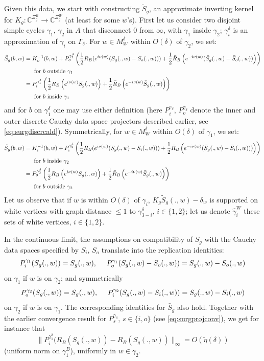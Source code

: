 \documentclass[10pt]{article}
\newcommand{\C}{\mathbb{C}}
\begin{document}
Given this data, we start with constructing $\tilde S_g$, an approximate inverting kernel for $K_g:\C^{\Xi_g^B}\rightarrow\C^{\Xi_g^W}$ (at least for some $w$'s). First let us consider two disjoint simple cycles $\gamma_1$, $\gamma_2$ in $A$ that disconnect $0$ from $\infty$, with $\gamma_1$ inside $\gamma_2$; $\gamma_i^\delta$ is an approximation of $\gamma_i$ on $\Gamma_\delta$. For $w\in M_W^\delta$ within $O(\delta)$ of $\gamma_2$, we set:
\begin{align*}
\tilde S_g(b,w)&=K_o^{-1}(b,w)+P_o^{\gamma^\delta_1}\left(\frac 12R_B(e^{i\nu(w)}(S_g(.,w)-S_o(.,w)))+\frac 12\bar R_B\left(e^{-i\nu(w)}(\bar S_g(.,w)-\bar S_o(.,w))\right)\right)\\
&{\rm\ \ \ \ \ for\ }b{\rm\ outside\ }\gamma_1\\
&=P_i^{\gamma^\delta_1}\left(\frac 12R_B\left(e^{i\nu(w)}S_g(.,w)\right)+\frac 12\bar R_B\left(e^{-i\nu(w)}\bar S_g(.,w)\right)\right)\\
&{\rm\ \ \ \ \ for\ }b{\rm\ inside\ }\gamma_1
\end{align*}
and for $b$ on $\gamma^\delta_1$ one may use either definition (here $P_i^{\gamma_\delta}$, $P_o^{\gamma_\delta}$ denote the inner and outer discrete Cauchy data space projectors described earlier, see \eqref{eq:surgdiscrcald}). Symmetrically, for $w\in M_W^\delta$ within $O(\delta)$ of $\gamma_1$, we set:
\begin{align*}
\tilde S_g(b,w)&=K_i^{-1}(b,w)+P_i^{\gamma^\delta_2}\left(\frac 12R_B(e^{i\nu(w)}(S_g(.,w)-S_i(.,w)))+\frac 12\bar R_B\left(e^{-i\nu(w)}(\bar S_g(.,w)-\bar S_i(.,w)))\right)\right)\\
&{\rm\ \ \ \ \ for\ }b{\rm\ inside\ }\gamma_2\\
&=P_o^{\gamma^\delta_2}\left(\frac 12R_B\left(e^{i\nu(w)}S_g(.,w)\right)+\frac 12\bar R_B\left(e^{-i\nu(w)}\bar S_g(.,w)\right)\right)\\
&{\rm\ \ \ \ \ for\ }b{\rm\ outside\ }\gamma_2
\end{align*}
Let us observe that if $w$ is within $O(\delta)$ of $\gamma_i$, $K_g\tilde S_g(.,w)-\delta_w$ is supported on white vertices with graph distance $\leq 1$ to $\gamma_{3-i}^\delta$, $i\in\{1,2\}$; let us denote $\hat\gamma^W_i$ these sets of white vertices, $i\in\{1,2\}$.

In the continuous limit, the assumptions on compatibility of $S_g$ with the Cauchy data spaces specified by $S_i$, $S_o$ translate into the replication identities: 
$$
P^{\gamma_1}_i(S_g(.,w))=S_g(.,w),{\rm\ \ \ \ }
P^{\gamma_1}_o(S_g(.,w)-S_o(.,w))=S_g(.,w)-S_o(.,w)
$$
on $\gamma_1$ if $w$ is on $\gamma_2$; and symmetrically
$$
P^{\gamma_2}_o(S_g(.,w))=S_g(.,w),{\rm\ \ \ \ }
P^{\gamma_2}_i(S_g(.,w)-S_i(.,w))=S_g(.,w)-S_i(.,w)
$$
on $\gamma_2$ if $w$ is on $\gamma_1$. The corresponding identities for $\bar S_g$ also hold. Together with the earlier convergence result for $P^{\gamma_\delta}_s$, $s\in\{i,o\}$ (see \eqref{eq:surgprojconv}), we get for instance that 
$$\|P^{\gamma^\delta_1}_i(R_B(S_g(.,w))-R_B(S_g(.,w))\|_\infty=O(\tilde\eta(\delta))$$ 
(uniform norm on $\gamma^B_1$), uniformly in $w\in\gamma_2$.
\end{document}
